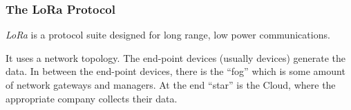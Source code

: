 \subsubsection{The LoRa Protocol}\label{subsubsec:LoRa_Protocol}
\begin{definition}[LoRa]\label{def:LoRa}
  \emph{LoRa} is a protocol suite designed for long range, low power communications.

  It uses a  network topology.
  The end-point devices (usually  devices) generate the data.
  In between the end-point devices, there is the ``fog'' which is some amount of network gateways and managers.
  At the end ``star'' is the Cloud, where the appropriate company collects their data.
\end{definition}

